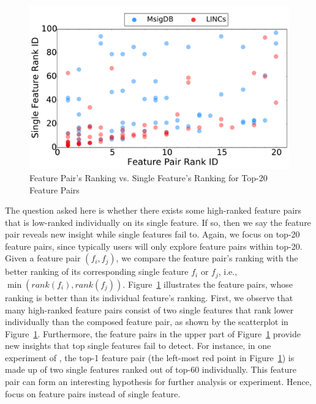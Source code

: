 \begin{figure}[h]
\vspace{-5mm}
  \centering
  \includegraphics[width=0.8\linewidth]{fig/better_rank_20.pdf}
  \vspace{-5mm}
\caption{Feature Pair's Ranking vs. Single Feature's Ranking for Top-20 Feature Pairs}
\vspace{-5mm}
\label{fig:better_rank_20}
\end{figure} 

 The question asked here is whether there exists some high-ranked feature pairs that is low-ranked individually on its single feature. If so, then we say the feature pair reveals new insight while single features fail to. Again, we focus on top-20 feature pairs, since typically users will only explore feature pairs within top-20. Given a feature pair $(f_i,f_j)$, we compare the feature pair's ranking with the better ranking of its corresponding single feature $f_i$ or $f_j$, i.e., $\min(rank(f_i),rank(f_j))$. Figure~\ref{fig:better_rank_20} illustrates the feature pairs, whose ranking is better than its individual feature's ranking. First, we observe that many high-ranked feature pairs consist of two single features that rank lower individually than the composed feature pair, as shown by the scatterplot in Figure~\ref{fig:better_rank_20}. Furthermore, the feature pairs in the upper part of Figure~\ref{fig:better_rank_20} provide new insights that top single features fail to detect. For instance, in one experiment of \lincs, the top-1 feature pair (the left-most red point in Figure~\ref{fig:better_rank_20}) is made up of two single features ranked out of top-60 individually. This feature pair can form an interesting hypothesis for further analysis or experiment. Hence, \genviz focus on feature pairs instead of single feature.



